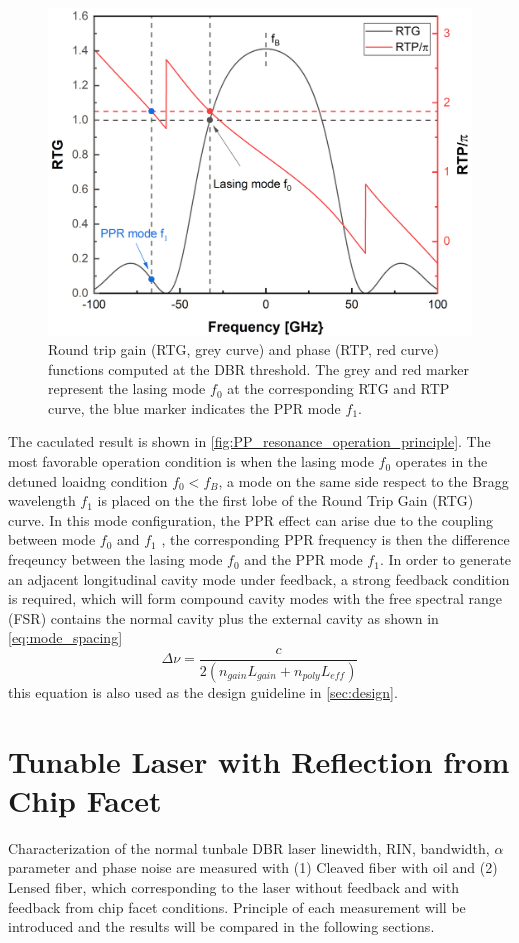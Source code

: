 \begin{figure}[ht]
    \centering
    \includegraphics[width=.65\linewidth]{figures/PP_resonance_operation_principle.png}
    \caption{Round trip gain (RTG, grey curve) and phase (RTP, red curve) functions computed at the DBR threshold. The grey and red marker represent the lasing mode $f_0$ at the corresponding RTG and RTP curve, the blue marker indicates the PPR mode $f_1$.}
    \label{fig:PP_resonance_operation_principle}
\end{figure}

The caculated result is shown in \autoref{fig:PP_resonance_operation_principle}. The most favorable operation condition is when the lasing mode $f_0$ operates in the detuned loaidng condition $f_0<f_B$, a mode on the same side respect to the Bragg wavelength $f_1$ is placed on the the first lobe of the Round Trip Gain (RTG) curve. In this mode configuration, the PPR effect can arise due to the coupling between mode $f_0$ and $f_1$ \cite{montrosset2014laser}, the corresponding PPR frequency is then the difference freqeuncy between the lasing mode $f_0$ and the PPR mode $f_1$. In order to generate an adjacent longitudinal cavity mode under feedback, a strong feedback condition is required, which will form compound cavity modes with the free spectral range (FSR) contains the normal cavity plus the external cavity as shown in \autoref{eq:mode_spacing}
\begin{equation}
    \Delta\nu=\frac{c}{2(n_{gain}L_{gain}+n_{poly}L_{eff})}
    \label{eq:mode_spacing}
\end{equation}
this equation is also used as the design guideline in \autoref{sec:design}.

\chapter{Tunable Laser with Reflection from Chip Facet}\label{ch:Normal_laser}
Characterization of the normal tunbale DBR laser linewidth, RIN, bandwidth, $\alpha$ parameter and phase noise are measured with (1) Cleaved fiber with oil and (2) Lensed fiber, which corresponding to the laser without feedback and with feedback from chip facet conditions. Principle of each measurement will be introduced and the results will be compared in the following sections.


